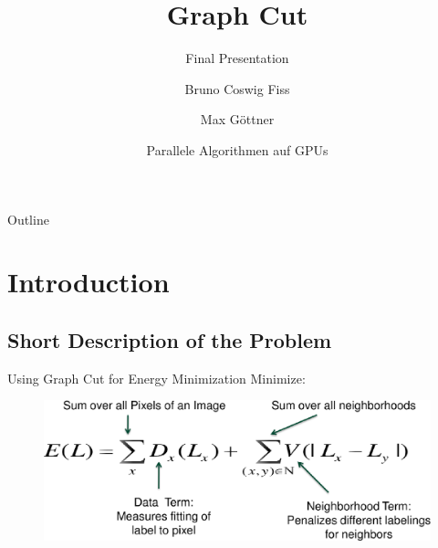 \documentclass{beamer}
\title[Graph Cut - Final Presentation] %
{Graph Cut}
\subtitle
{Final Presentation}
\author[Bruno C. Fiss, Max Göttner] %
{Bruno Coswig Fiss \and Max Göttner}
\institute[TU Berlin] %
{
  \inst{1}%
  Institut für Technische Informatik und Mikroelektronik\\
  Technische Universität Berlin}
\date[\today] %
{Parallele Algorithmen auf GPUs}
\begin{document}
\begin{frame}
  \titlepage
\end{frame}

\begin{frame}{Outline}
  \tableofcontents
\end{frame}





\section{Introduction}
\subsection{Short Description of the Problem}

\begin{frame}{Using Graph Cut for Energy Minimization}
   Minimize:
   \begin{figure}
   \includegraphics[scale=0.5]{formula} 
   \end{figure}
\end{frame}
\end{document}
